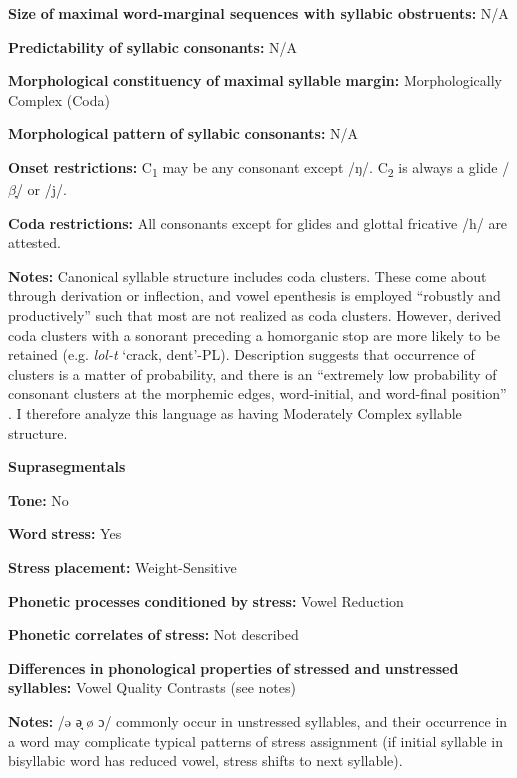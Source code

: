 \begin{styleBody}
\textbf{Size} \textbf{of} \textbf{maximal} \textbf{word{}-marginal sequences with syllabic obstruents:} N/A

\textbf{Predictability} \textbf{of} \textbf{syllabic} \textbf{consonants:} N/A

\textbf{Morphological} \textbf{constituency} \textbf{of} \textbf{maximal} \textbf{syllable} \textbf{margin:} Morphologically Complex (Coda)

\textbf{Morphological} \textbf{pattern} \textbf{of} \textbf{syllabic} \textbf{consonants:} N/A

\textbf{Onset} \textbf{restrictions:} C\textsubscript{1} may be any consonant except /ŋ/. C\textsubscript{2} is always a glide /$\beta ̞$/ or /j/.

\textbf{Coda} \textbf{restrictions:} All consonants except for glides and glottal fricative /h/ are attested. 

\textbf{Notes:} Canonical syllable structure includes coda clusters. These come about through derivation or inflection, and vowel epenthesis is employed “robustly and productively” such that most are not realized as coda clusters. However, derived coda clusters with a sonorant preceding a homorganic stop are more likely to be retained (e.g. \textit{lol-t} ‘crack, dent’-PL). Description suggests that occurrence of clusters is a matter of probability, and there is an “extremely low probability of consonant clusters at the morphemic edges, word-initial, and word-final position” \citep[55]{Filchenko2007}. I therefore analyze this language as having Moderately Complex syllable structure.

\textbf{Suprasegmentals}

\textbf{Tone:} No

\textbf{Word} \textbf{stress:} Yes

\textbf{Stress} \textbf{placement:} Weight-Sensitive

\textbf{Phonetic} \textbf{processes} \textbf{conditioned} \textbf{by} \textbf{stress:} Vowel Reduction

\textbf{Phonetic} \textbf{correlates} \textbf{of} \textbf{stress:} Not described

\textbf{Differences} \textbf{in} \textbf{phonological} \textbf{properties} \textbf{of} \textbf{stressed} \textbf{and} \textbf{unstressed} \textbf{syllables:} Vowel Quality Contrasts (see notes)

\textbf{Notes:} /ə ə̘ ø ɔ/ commonly occur in unstressed syllables, and their occurrence in a word may complicate typical patterns of stress assignment (if initial syllable in bisyllabic word has reduced vowel, stress shifts to next syllable).


\end{styleBody}
